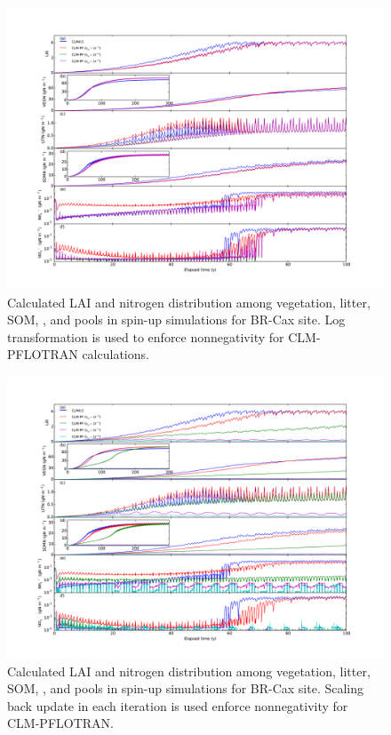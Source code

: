 \documentclass[gmd, manuscript]{copernicus}
\begin{document}
\begin{figure}[t]
\includegraphics[width=1.0\textwidth]{../figs/fig12/cax300yl.pdf}
\caption{Calculated LAI and nitrogen distribution among vegetation, litter,
SOM, , and  pools in spin-up simulations for BR-Cax
site. Log transformation is used to enforce nonnegativity for CLM-PFLOTRAN
calculations.}
\label{fig:cax300yl}
\end{figure}

\begin{figure}[t]
\includegraphics[width=1.0\textwidth]{../figs/fig13/cax300y.pdf}
\caption{Calculated LAI and nitrogen distribution among vegetation, litter,
SOM,  , and  pools in spin-up simulations for BR-Cax
site. Scaling back update in each iteration is used enforce nonnegativity for
CLM-PFLOTRAN.}
\label{fig:cax300y}
\end{figure}
\end{document}
